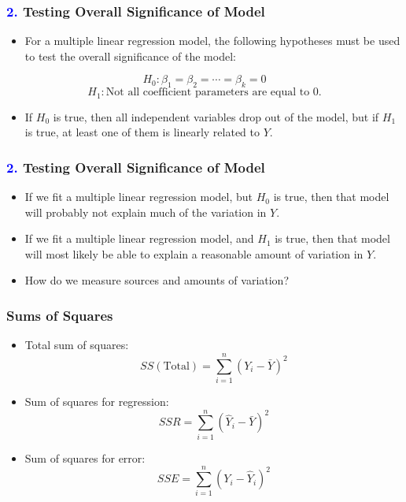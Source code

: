 \documentclass[14pt]{beamer}
\begin{document}
\begin{frame}
	\frametitle{\textcolor{blue}{2.} Testing Overall Significance of Model}
	
	\begin{itemize}[label={\color{blue}$\blacktriangleright$}]
		\item For a multiple linear regression model, the following hypotheses must be used to test the overall significance of the model:
	\end{itemize}
	
	\[
	H_0 : \beta_1 = \beta_2 = \cdots = \beta_k = 0
	\]
	\[
	H_1 : \text{Not all coefficient parameters are equal to 0.}
	\]
	
	\begin{itemize}[label={\color{blue}$\blacktriangleright$}]
		\item If $H_0$ is true, then all independent variables drop out of the model, but if $H_1$ is true, at least one of them is linearly related to $Y$.
	\end{itemize}
	
\end{frame}
\begin{frame}
	\frametitle{\textcolor{blue}{2.} Testing Overall Significance of Model}
	
	\begin{itemize}[label={\color{blue}$\blacktriangleright$}]
		\item If we fit a multiple linear regression model, but $H_0$ is true, then that model will probably not explain much of the variation in $Y$.
		
		\item If we fit a multiple linear regression model, and $H_1$ is true, then that model will most likely be able to explain a reasonable amount of variation in $Y$.
		
		\item How do we measure sources and amounts of variation?
	\end{itemize}
	
\end{frame}
\begin{frame}
	\frametitle{Sums of Squares}
	
	\begin{itemize}[label={\color{blue}$\blacktriangleright$}]
		\item Total sum of squares:
		\[
		SS(\text{Total}) = \sum_{i=1}^n (Y_i - \bar{Y})^2
		\]
		
		\item Sum of squares for regression:
		\[
		SSR = \sum_{i=1}^n (\hat{Y}_i - \bar{Y})^2
		\]
		
		\item Sum of squares for error:
		\[
		SSE = \sum_{i=1}^n (Y_i - \hat{Y}_i)^2
		\]
	\end{itemize}
	
\end{frame}
\end{document}

